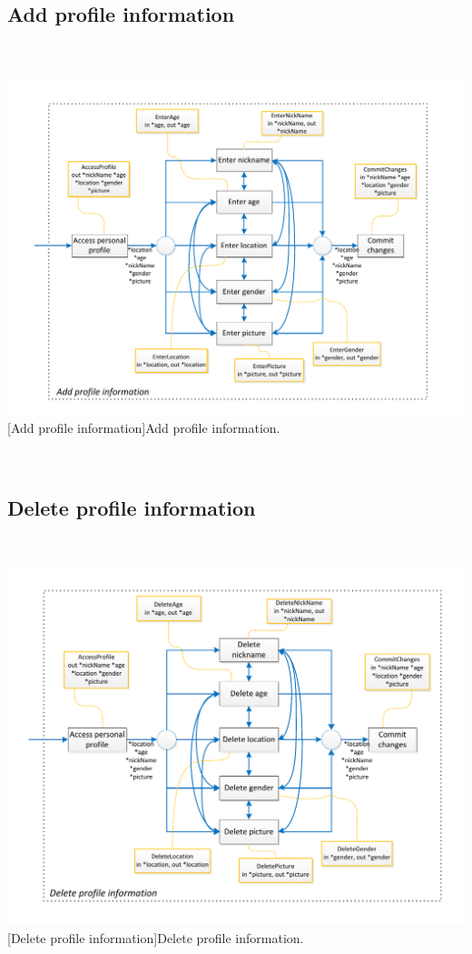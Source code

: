\documentclass[11pt, a4paper,svglistings,oneside]{book}
\begin{document}
\subsection{Add profile information}

$\;$ \\
\noindent\begin{minipage}{\textwidth}
    \centering
   \includegraphics[scale=1]{nav_AddProfileInformation.pdf}
 [Add profile information]{Add profile information.}
\end{minipage}
$\;$ \\ 

\subsection{Delete profile information}

$\;$ \\
\noindent\begin{minipage}{\textwidth}
    \centering
   \includegraphics[scale=1]{nav_DeleteProfileInformation.pdf}
 [Delete profile information]{Delete profile information.}
\end{minipage}
$\;$ \\ 
\end{document}
